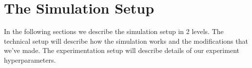 \documentclass{article}
\begin{document}
\section{The Simulation Setup}
In the following sections we describe the simulation setup in 2 levels. 
The technical setup will describe how the simulation works and the modifications that we've made. The experimentation setup will describe details of our experiment hyperparameters.
\\
\end{document}
